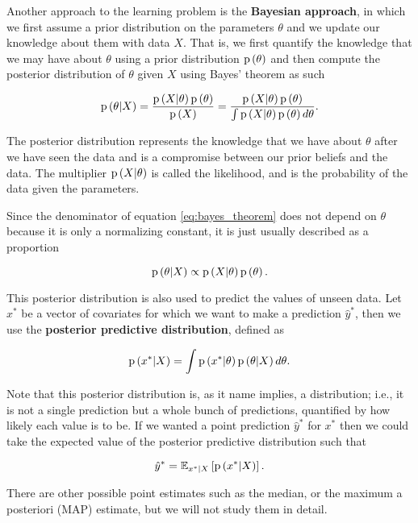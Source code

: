 Another approach to the learning problem is the \textbf{Bayesian approach}, in which we first assume a prior distribution on the parameters $\theta$ and we update our knowledge about them with data $X$. That is, we first quantify the knowledge that we may have about $\theta$ using a prior distribution $\mathrm{p}\left( \theta \right)$ and then compute the posterior distribution of $\theta$ given $X$ using Bayes' theorem as such

\begin{equation}
  \label{eq:bayes_theorem}
  \mathrm{p}\left( \theta | X \right) = \frac{\mathrm{p}\left( X | \theta \right) \mathrm{p}\left( \theta \right)}{\mathrm{p}\left( X \right)} = \frac{\mathrm{p}\left( X | \theta \right) \mathrm{p}\left( \theta \right)}{\int \mathrm{p}\left( X | \theta \right) \mathrm{p}\left( \theta \right) d\theta}.
\end{equation}

The posterior distribution represents the knowledge that we have about $\theta$ after we have seen the data and is a compromise between our prior beliefs and the data. The multiplier $\mathrm{p}\left( X | \theta \right)$ is called the likelihood, and is the probability of the data given the parameters.

Since the denominator of equation \ref{eq:bayes_theorem} does not depend on $\theta$ because it is only a normalizing constant, it is just usually described as a proportion

\begin{equation}
  \label{eq:bayes_theorem_prop}
    \mathrm{p}\left( \theta | X \right) \propto \mathrm{p}\left( X | \theta \right) \mathrm{p}\left( \theta \right).
\end{equation}

This posterior distribution is also used to predict the values of unseen data. Let $x^*$ be a vector of covariates for which we want to make a prediction $\hat{y}^*$, then we use the \textbf{posterior predictive distribution}, defined as

$$
  \mathrm{p}\left( x^* | X \right) = \int \mathrm{p}\left( x^* | \theta \right) \mathrm{p}\left( \theta | X \right) d\theta.
$$

Note that this posterior distribution is, as it name implies, a distribution; i.e., it is not a single prediction but a whole bunch of predictions, quantified by how likely each value is to be. If we wanted a point prediction $\hat{y}^*$ for $x^*$ then we could take the expected value of the posterior predictive distribution such that

$$
  \hat{y}^* = \mathbb{E}_{x^* | X} \left[ \mathrm{p}\left( x^* | X \right) \right].
$$

There are other possible point estimates such as the median, or the maximum a posteriori (MAP) estimate, but we will not study them in detail.

